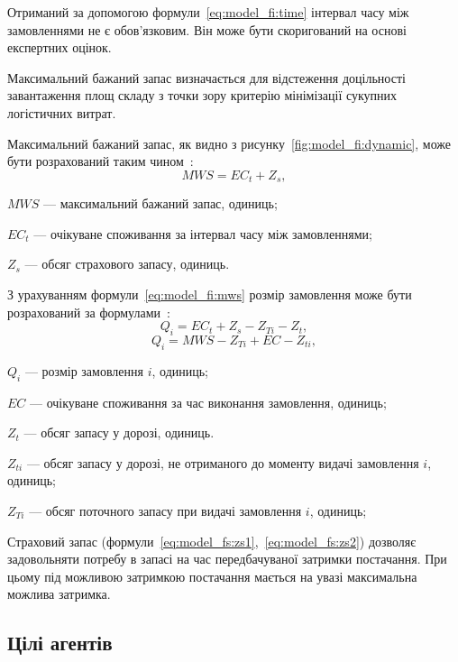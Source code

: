 Отриманий за допомогою формули~\eqref{eq:model_fi:time} інтервал часу між замовленнями не є обов'язковим.
Він може бути скоригований на основі експертних оцінок.

Максимальний бажаний запас визначається для відстеження доцільності завантаження площ складу з точки зору критерію мінімізації сукупних логістичних витрат.

Максимальний бажаний запас, як видно з рисунку~\ref{fig:model_fi:dynamic}, може бути розрахований таким чином~\cite{Sterligova2008}:
\begin{equation} \label{eq:model_fi:mws}
MWS=EC_t+Z_s
,
\end{equation}
\begin{description}
	\item[де] $MWS$ --- максимальний бажаний запас, одиниць;
	\item $EC_t$ --- очікуване споживання за інтервал часу між замовленнями;
	\item $Z_s$ --- обсяг страхового запасу, одиниць.
\end{description}

З урахуванням формули~\eqref{eq:model_fi:mws} розмір замовлення може бути розрахований за формулами~\cite{Sterligova2008}:
\begin{equation} \label{eq:order}
Q_i=EC_t+Z_s-Z_{Ti}-Z_t
,
\end{equation}
\begin{equation} \label{eq:order2}
Q_i=MWS-Z_{Ti}+EC-Z_{ti}
,
\end{equation}
\begin{description}
	\item[де] $Q_i$ --- розмір замовлення $i$, одиниць;
	\item $EC$ --- очікуване споживання за час виконання замовлення, одиниць;
	\item $Z_t$ --- обсяг запасу у дорозі, одиниць.
	\item $Z_{ti}$ --- обсяг запасу у дорозі, не отриманого до моменту видачі замовлення $i$, одиниць;
	\item $Z_{Ti}$ --- обсяг поточного запасу при видачі замовлення $i$, одиниць;
\end{description}

Страховий запас (формули~\ref{eq:model_fs:zs1},~\ref{eq:model_fs:zs2}) дозволяє задовольняти потребу в запасі на час передбачуваної затримки постачання.
При цьому під можливою затримкою постачання мається на увазі максимальна можлива затримка.

\subsection{Цілі агентів}
